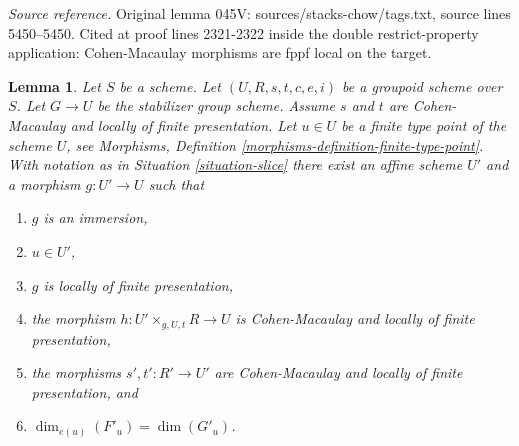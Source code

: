 \documentclass{stacks-project}
\theoremstyle{plain}
\newtheorem{lemma}[subsection]{Lemma}
\theoremstyle{definition}
\theoremstyle{remark}
\numberwithin{equation}{subsection}
\begin{document}
\noindent\textit{Source reference.} Original lemma 045V: sources/stacks-chow/tags.txt, source lines 5450--5450. Cited at proof lines 2321-2322 inside the double restrict-property application: Cohen-Macaulay morphisms are fppf local on the target.\par\medskip
\begin{lemma}
\label{lemma-max-slice}
Let $S$ be a scheme.
Let $(U, R, s, t, c, e, i)$ be a groupoid scheme over $S$.
Let $G \to U$ be the stabilizer group scheme.
Assume $s$ and $t$ are Cohen-Macaulay and locally of finite presentation.
Let $u \in U$ be a finite type point of the scheme $U$, see
Morphisms, Definition \ref{morphisms-definition-finite-type-point}.
With notation as in
Situation \ref{situation-slice}
there exist an affine scheme $U'$ and a morphism $g : U' \to U$ such that
\begin{enumerate}
\item $g$ is an immersion,
\item $u \in U'$,
\item $g$ is locally of finite presentation,
\item the morphism $h : U' \times_{g, U, t} R \longrightarrow U$
is Cohen-Macaulay and locally of finite presentation,
\item the morphisms $s', t' : R' \to U'$ are Cohen-Macaulay and
locally of finite presentation, and
\item $\dim_{e(u)}(F'_u) = \dim(G'_u)$.
\end{enumerate}
\end{lemma}
\end{document}
